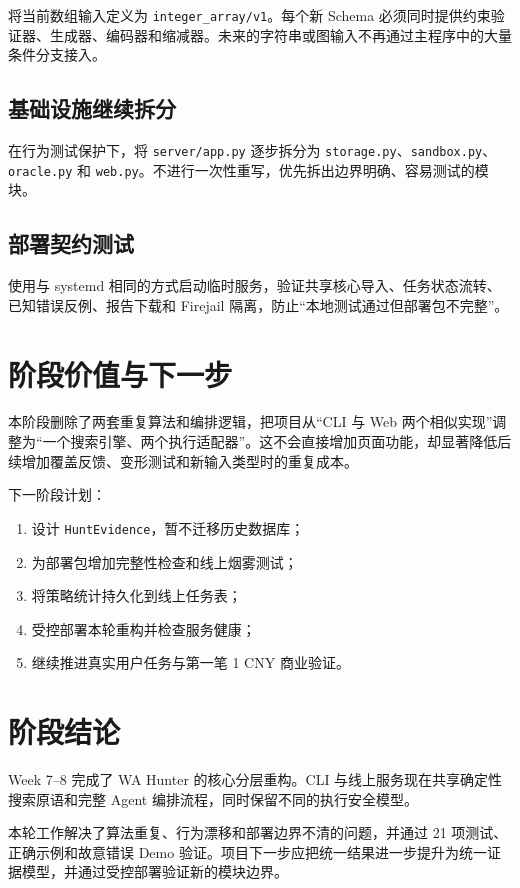 \documentclass[10pt,a4paper]{ctexart}
\newcommand{\code}[1]{\texttt{#1}}
\begin{document}
将当前数组输入定义为 \code{integer\_array/v1}。每个新 Schema 必须同时提供约束验证器、生成器、编码器和缩减器。未来的字符串或图输入不再通过主程序中的大量条件分支接入。

\subsection{基础设施继续拆分}

在行为测试保护下，将 \code{server/app.py} 逐步拆分为 \code{storage.py}、\code{sandbox.py}、\code{oracle.py} 和 \code{web.py}。不进行一次性重写，优先拆出边界明确、容易测试的模块。

\subsection{部署契约测试}

使用与 systemd 相同的方式启动临时服务，验证共享核心导入、任务状态流转、已知错误反例、报告下载和 Firejail 隔离，防止“本地测试通过但部署包不完整”。

\section{阶段价值与下一步}

本阶段删除了两套重复算法和编排逻辑，把项目从“CLI 与 Web 两个相似实现”调整为“一个搜索引擎、两个执行适配器”。这不会直接增加页面功能，却显著降低后续增加覆盖反馈、变形测试和新输入类型时的重复成本。

下一阶段计划：
\begin{enumerate}
  \item 设计 \code{HuntEvidence}，暂不迁移历史数据库；
  \item 为部署包增加完整性检查和线上烟雾测试；
  \item 将策略统计持久化到线上任务表；
  \item 受控部署本轮重构并检查服务健康；
  \item 继续推进真实用户任务与第一笔 1 CNY 商业验证。
\end{enumerate}

\section{阶段结论}

Week 7--8 完成了 WA Hunter 的核心分层重构。CLI 与线上服务现在共享确定性搜索原语和完整 Agent 编排流程，同时保留不同的执行安全模型。

本轮工作解决了算法重复、行为漂移和部署边界不清的问题，并通过 21 项测试、正确示例和故意错误 Demo 验证。项目下一步应把统一结果进一步提升为统一证据模型，并通过受控部署验证新的模块边界。
\end{document}
